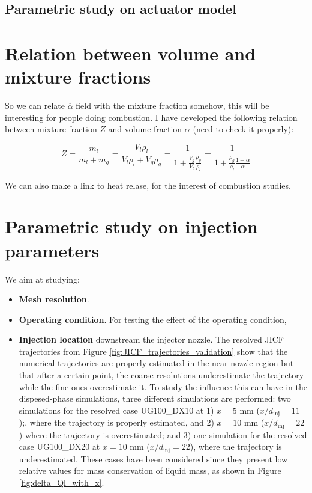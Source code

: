 \subsection{Parametric study on actuator model}


\section{Relation between volume and mixture fractions}

So we can relate $\overline{\alpha}$ field with the mixture fraction somehow, this will be interesting for people doing combustion. I have developed the following relation between mixture fraction $Z$ and volume fraction $\alpha$ (need to check it properly):

\begin{equation}
Z = \frac{m_l}{m_l + m_g} = \frac{V_l \rho_l}{V_l \rho_l + V_g \rho_g} = \frac{1}{1 + \frac{V_g}{V_l} \frac{\rho_g}{\rho_l}} = \frac{1}{1 + \frac{\rho_g}{\rho_l} \frac{1 - \alpha}{\alpha}}
\end{equation}


We can also make a link to heat relase, for the interest of combustion studies.


\clearpage

\section{Parametric study on injection parameters}

We aim at studying:

\begin{itemize}

		\item \textbf{Mesh resolution}. 
	
		\item \textbf{Operating condition}. For testing the effect of the operating condition, 

	\item \textbf{Injection location} downstream the injector nozzle. The resolved JICF trajectories from Figure \ref{fig:JICF_trajectories_validation} show that the numerical trajectories are properly estimated in the near-nozzle region but that after a certain point, the coarse resolutions underestimate the trajectory while the fine ones overestimate it. To study the influence this can have in the dispesed-phase simulations, three different simulations are performed: two simulations for the resolved case UG100\_DX10 at 1) $x = 5$ mm ($x/d_\mathrm{inj} = 11$);, where the trajectory is properly estimated, and 2) $x = 10$ mm ($x/d_\mathrm{inj} = 22$) where the trajectory is overestimated; and 3) one simulation for the resolved case UG100\_DX20 at $x = 10$ mm ($x/d_\mathrm{inj} = 22$), where the trajectory is underestimated. These cases have been considered since they present low relative values for mass conservation of liquid mass, as shown in Figure \ref{fig:delta_Ql_with_x}.
	


\end{itemize}

